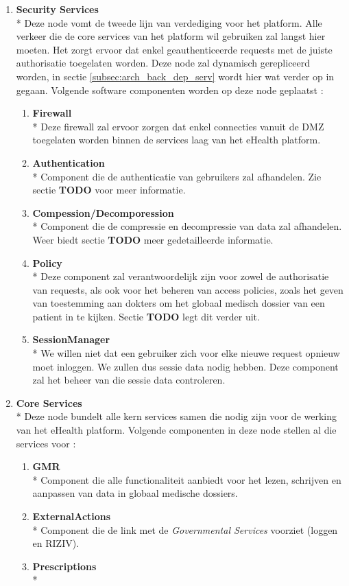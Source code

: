 \documentclass[a4paper,10pt]{article}
\begin{document}
\begin{enumerate}
\item \textbf{Security Services}\\*
Deze node vomt de tweede lijn van verdediging voor het platform. Alle verkeer die de core services van het platform wil gebruiken zal langst hier moeten. Het zorgt ervoor dat enkel geauthenticeerde requests met de juiste authorisatie toegelaten worden. Deze node zal dynamisch gerepliceerd worden, in sectie \ref{subsec:arch_back_dep_serv} wordt hier wat verder op in gegaan. Volgende software componenten worden op deze node geplaatst : 
\begin{enumerate}
 \item \textbf{Firewall}\\*
Deze firewall zal ervoor zorgen dat enkel connecties vanuit de DMZ toegelaten worden binnen de services laag van het eHealth platform.
\item \textbf{Authentication}\\*
Component die de authenticatie van gebruikers zal afhandelen. Zie sectie \textbf{TODO} voor meer informatie.
\item \textbf{Compession/Decomporession}\\*
Component die de compressie en decompressie van data zal afhandelen. Weer biedt sectie \textbf{TODO} meer gedetailleerde informatie.
\item \textbf{Policy}\\*
Deze component zal verantwoordelijk zijn voor zowel de authorisatie van requests, als ook voor het beheren van access policies, zoals het geven van toestemming aan dokters om het globaal medisch dossier van een patient in te kijken. Sectie \textbf{TODO} legt dit verder uit.
\item \textbf{SessionManager}\\*
We willen niet dat een gebruiker zich voor elke nieuwe request opnieuw moet inloggen. We zullen dus sessie data nodig hebben. Deze component zal het beheer van die sessie data controleren.
\end{enumerate}

\item \textbf{Core Services}\\*
Deze node bundelt alle kern services samen die nodig zijn voor de werking van het eHealth platform. Volgende componenten in deze node stellen al die services voor : 
\begin{enumerate}
 \item \textbf{GMR}\\*
Component die alle functionaliteit aanbiedt voor het lezen, schrijven en aanpassen van data in globaal medische dossiers.
\item \textbf{ExternalActions}\\*
Component die de link met de \textit{Governmental Services} voorziet (loggen en RIZIV).
\item \textbf{Prescriptions}\\*
\end{enumerate}

\end{enumerate}
\end{document}
